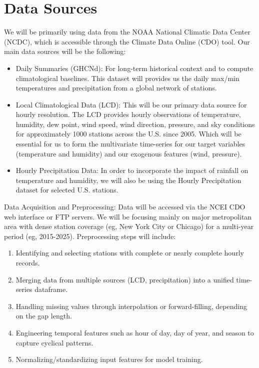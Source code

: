 \documentclass{article}
\begin{document}
\section{Data Sources}

We will be primarily using data from the NOAA National Climatic Data Center (NCDC), which is accessible through the Climate Data Online (CDO) tool. Our main data sources will be the following:

\begin{itemize}
    \item Daily Summaries (GHCNd): For long-term historical context and to compute climatological baselines. This dataset will provides us the daily max/min temperatures and precipitation from a global network of stations.
    \item Local Climatological Data (LCD): This will be our primary data source for hourly resolution. The LCD provides hourly observations of temperature, humidity, dew point, wind speed, wind direction, pressure, and sky conditions for approximately 1000 stations across the U.S. since 2005. Which will be essential for us to form the multivariate time-series for our target variables (temperature and humidity) and our exogenous features (wind, pressure).
    \item Hourly Precipitation Data: In order to incorporate the impact of rainfall on temperature and humidity, we will also be using the Hourly Precipitation dataset for selected U.S. stations.
\end{itemize}

Data Acquisition and Preprocessing: Data will be accessed via the NCEI CDO web interface or FTP servers. We will be focusing mainly on major metropolitan area with dense station coverage (eg, New York City or Chicago) for a multi-year period (eg, 2015-2025). Preprocessing steps will include:
\begin{enumerate}
    \item Identifying and selecting stations with complete or nearly complete hourly records.
    \item Merging data from multiple sources (LCD, precipitation) into a unified time-series dataframe.
    \item Handling missing values through interpolation or forward-filling, depending on the gap length.
    \item Engineering temporal features such as hour of day, day of year, and season to capture cyclical patterns.
    \item Normalizing/standardizing input features for model training.
\end{enumerate}
\end{document}
